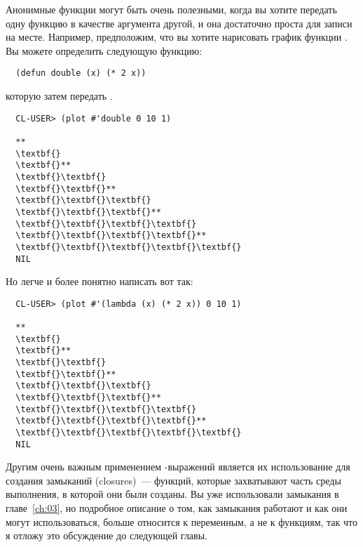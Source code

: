 Анонимные функции могут быть очень полезными, когда вы хотите передать одну функцию в
качестве аргумента другой, и она достаточно проста для записи на месте.  Например,
предположим, что вы хотите нарисовать график функции . Вы можете определить
следующую функцию:

\begin{lstlisting}
  (defun double (x) (* 2 x))
\end{lstlisting}

которую затем передать .

\begin{verbatim}
  CL-USER> (plot #'double 0 10 1)
  
  **
  \textbf{}
  \textbf{}**
  \textbf{}\textbf{}
  \textbf{}\textbf{}**
  \textbf{}\textbf{}\textbf{}
  \textbf{}\textbf{}\textbf{}**
  \textbf{}\textbf{}\textbf{}\textbf{}
  \textbf{}\textbf{}\textbf{}\textbf{}**
  \textbf{}\textbf{}\textbf{}\textbf{}\textbf{}
  NIL
\end{verbatim}

Но легче и более понятно написать вот так:

\begin{verbatim}
  CL-USER> (plot #'(lambda (x) (* 2 x)) 0 10 1)
  
  **
  \textbf{}
  \textbf{}**
  \textbf{}\textbf{}
  \textbf{}\textbf{}**
  \textbf{}\textbf{}\textbf{}
  \textbf{}\textbf{}\textbf{}**
  \textbf{}\textbf{}\textbf{}\textbf{}
  \textbf{}\textbf{}\textbf{}\textbf{}**
  \textbf{}\textbf{}\textbf{}\textbf{}\textbf{}
  NIL
\end{verbatim}

Другим очень важным применением -выражений является их использование для
создания замыканий (closures)~--- функций, которые захватывают часть среды выполнения, в
которой они были созданы.  Вы уже использовали замыкания в главе~\ref{ch:03}, но подробное
описание о том, как замыкания работают и как они могут использоваться, больше относится к
переменным, а не к функциям, так что я отложу это обсуждение до следующей главы.

